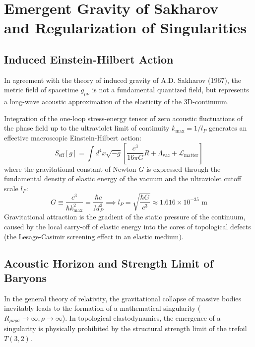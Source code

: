 \documentclass[12pt,a4paper]{article}
\begin{document}
		\section{Emergent Gravity of Sakharov\\ and Regularization of Singularities}
		
		\subsection{Induced Einstein-Hilbert Action}
		In agreement with the theory of induced gravity of A.D. Sakharov (1967), the metric field of spacetime $g_{\mu\nu}$ is not a fundamental quantized field, but represents a long-wave acoustic approximation of the elasticity of the 3D-continuum.
		
		Integration of the one-loop stress-energy tensor of zero acoustic fluctuations of the phase field up to the ultraviolet limit of continuity $k_{\text{max}} = 1/l_P$ generates an effective macroscopic Einstein-Hilbert action:
		\begin{equation}
			S_{\text{eff}}[g] = \int d^4x \sqrt{-g} \left[ \frac{c^3}{16\pi G} R + \Lambda_{\text{vac}} + \mathcal{L}_{\text{matter}} \right]
		\end{equation}
		where the gravitational constant of Newton $G$ is expressed through the fundamental density of elastic energy of the vacuum and the ultraviolet cutoff scale $l_P$:
		\begin{equation}
			G \equiv \frac{c^3}{\hbar k_{\text{max}}^2} = \frac{\hbar c}{M_P^2} \implies l_P = \sqrt{\frac{\hbar G}{c^3}} \approx 1.616 \times 10^{-35} \text{ m}
		\end{equation}
		Gravitational attraction is the gradient of the static pressure of the continuum, caused by the local carry-off of elastic energy into the cores of topological defects (the Lesage-Casimir screening effect in an elastic medium).
		
		\subsection{Acoustic Horizon and Strength Limit of Baryons}
		In the general theory of relativity, the gravitational collapse of massive bodies inevitably leads to the formation of a mathematical singularity ($R_{\mu\nu\rho\sigma} \to \infty, \rho \to \infty$). In topological elastodynamics, the emergence of a singularity is physically prohibited by the structural strength limit of the trefoil $T(3,2)$.
		
\end{document}
